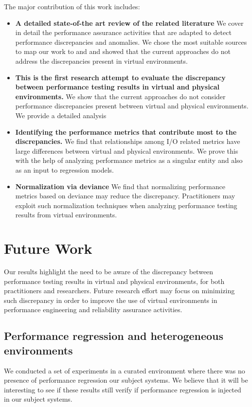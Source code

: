 The major contribution of this work includes: 
\begin{itemize} \itemsep -0.4pt 
	\item \textbf{A detailed state-of-the art review of the related literature} We cover in detail the performance assurance activities that are adapted to detect performance discrepancies and anomalies. We chose the most suitable  sources to map our work to and and showed that the current approaches do not address the discrepancies present in virtual environments.
	
	\item \textbf{This is the first research attempt to evaluate the discrepancy between performance testing results in virtual and physical environments.} We show that the current approaches do not consider performance discrepancies present between virtual and physical environments. We provide a detailed analysis 
	
	\item \textbf{Identifying the performance metrics that contribute most to the discrepancies.} We find that relationships among I/O related metrics have large differences between virtual and physical environments. We prove this with the help of analyzing performance metrics as a singular entity and also as an input to regression models.
	
	\item \textbf{Normalization via deviance} We find that normalizing performance metrics based on deviance may reduce the discrepancy. Practitioners may exploit such normalization techniques when analyzing performance testing results from virtual environments.
\end{itemize}


\section{Future Work}

Our results highlight the need to be aware of the discrepancy between performance testing results in virtual and physical environments, for both practitioners and researchers. Future research effort may focus on minimizing such discrepancy in order to improve the use of virtual environments in performance engineering and reliability assurance activities.

\subsection{Performance regression and heterogeneous environments}
We conducted a set of experiments in a curated environment where there was no presence of performance regression our subject systems. We believe that it will be interesting to see if these results still verify if performance regression is injected in our subject systems.


